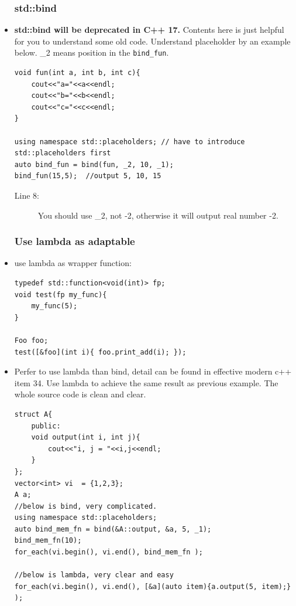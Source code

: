 \documentclass[a4paper,11pt,twoside]{book}
\begin{document}
\begin{itemize}
\subsubsection{std::bind}

	\item \textbf{std::bind will be deprecated in C++ 17.} Contents here is just helpful for you to understand some old code.  Understand placeholder by an example below. \_2 means position in the \texttt{bind\_fun}. 
\begin{lstlisting}
void fun(int a, int b, int c){
	cout<<"a="<<a<<endl;
	cout<<"b="<<b<<endl;
	cout<<"c="<<c<<endl;
}

using namespace std::placeholders; // have to introduce std::placeholders first
auto bind_fun = bind(fun, _2, 10, _1);
bind_fun(15,5);  //output 5, 10, 15
\end{lstlisting}
\begin{description}
	\item[Line 8:] You should use \_2, not -2, otherwise it will output real number -2.
\end{description}
	

\subsubsection{Use lambda as adaptable}
	\item use lambda as wrapper function:
\begin{lstlisting}[numbers=none]
typedef std::function<void(int)> fp;
void test(fp my_func){
	my_func(5);
}

Foo foo;
test([&foo](int i){ foo.print_add(i); });
\end{lstlisting}
	
	\item Perfer to use lambda than bind, detail can be found in effective modern c++ item 34. Use lambda to achieve the same result as previous example. The whole source code is clean and clear. 

\begin{lstlisting}
struct A{
	public:
	void output(int i, int j){
		cout<<"i, j = "<<i,j<<endl;
	}
};
vector<int> vi  = {1,2,3};
A a;
//below is bind, very complicated.
using namespace std::placeholders;
auto bind_mem_fn = bind(&A::output, &a, 5, _1);
bind_mem_fn(10);
for_each(vi.begin(), vi.end(), bind_mem_fn );

//below is lambda, very clear and easy
for_each(vi.begin(), vi.end(), [&a](auto item){a.output(5, item);} );	
\end{lstlisting}

\end{itemize}
\end{document}
